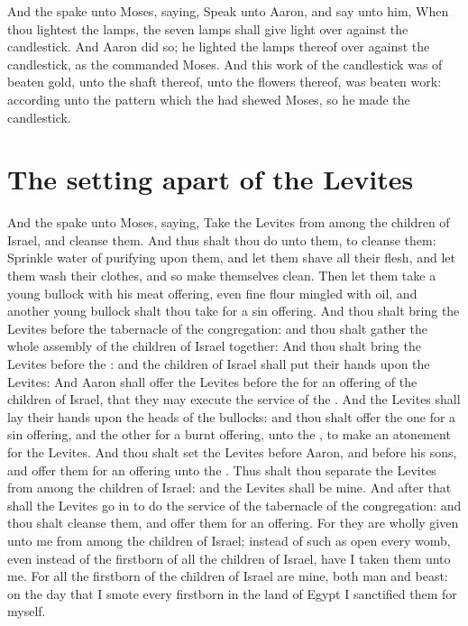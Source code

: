 \begin{biblechapter} %
\verse And the \LORD spake unto Moses, saying,
\verse Speak unto Aaron, and say unto him, When thou lightest the lamps, the seven lamps shall give light over against the candlestick.
\verse And Aaron did so; he lighted the lamps thereof over against the candlestick, as the \LORD commanded Moses.
\verse And this work of the candlestick was of beaten gold, unto the shaft thereof, unto the flowers thereof, was beaten work: according unto the pattern which the \LORD had shewed Moses, so he made the candlestick.
\section*{The setting apart of the Levites}
\verse And the \LORD spake unto Moses, saying,
\verse Take the Levites from among the children of Israel, and cleanse them.
\verse And thus shalt thou do unto them, to cleanse them: Sprinkle water of purifying upon them, and let them shave all their flesh, and let them wash their clothes, and so make themselves clean.
\verse Then let them take a young bullock with his meat offering, even fine flour mingled with oil, and another young bullock shalt thou take for a sin offering.
\verse And thou shalt bring the Levites before the tabernacle of the congregation: and thou shalt gather the whole assembly of the children of Israel together:
\verse And thou shalt bring the Levites before the \LORD: and the children of Israel shall put their hands upon the Levites:
\verse And Aaron shall offer the Levites before the \LORD for an offering of the children of Israel, that they may execute the service of the \LORD.
\verse And the Levites shall lay their hands upon the heads of the bullocks: and thou shalt offer the one for a sin offering, and the other for a burnt offering, unto the \LORD, to make an atonement for the Levites.
\verse And thou shalt set the Levites before Aaron, and before his sons, and offer them for an offering unto the \LORD.
\verse Thus shalt thou separate the Levites from among the children of Israel: and the Levites shall be mine.
\verse And after that shall the Levites go in to do the service of the tabernacle of the congregation: and thou shalt cleanse them, and offer them for an offering.
\verse For they are wholly given unto me from among the children of Israel; instead of such as open every womb, even instead of the firstborn of all the children of Israel, have I taken them unto me.
\verse For all the firstborn of the children of Israel are mine, both man and beast: on the day that I smote every firstborn in the land of Egypt I sanctified them for myself.

\end{biblechapter}
